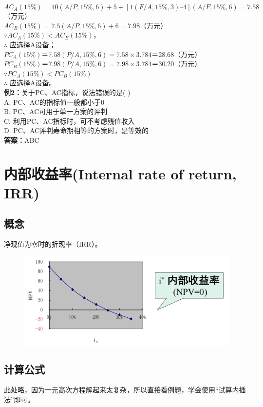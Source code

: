 \\
$AC_A(15\%) = 10(A/P,15\%,6) + 5 + [1(F/A,15\%,3) – 4](A/F,15\%,6)= 7.58$（万元）\\
$AC_B(15\%) = 7.5 (A/P,15\%,6) + 6 = 7.98$（万元）\\
$\because AC_A(15\%) < AC_B(15\%)$，\\
$\therefore$ 应选择A设备；\\
$PC_A(15\%)＝7.58 (P/A,15\%,6) =7.58×3.784＝28.68$（万元）\\
$PC_B(15\%)＝7.98 (P/A,15\%,6) =7.98×3.784＝30.20$（万元）\\
$\because PC_A(15\%) < PC_B(15\%)$\\
$\therefore$ 应选择A设备。\\
\textbf{例2：}关于PC、AC指标，说法错误的是( )\\
A. PC、AC的指标值一般都小于0\\
B. PC、AC可用于单一方案的评判\\
C. 利用PC、AC指标时，可不考虑残值收入\\
D. PC、AC评判寿命期相等的方案时，是等效的\\
\textbf{答案：}ABC

\section{内部收益率(Internal rate of return, IRR)}
\subsection{概念}
净现值为零时的折现率（IRR）。
\begin{figure}[H]
    \centering
    \includegraphics[width=\textwidth]{image/内部收益率IRR.png}
    \label{fig:17}
\end{figure}

\subsection{计算公式}
此处略，因为一元高次方程解起来太复杂，所以直接看例题，学会使用“试算内插法”即可。

